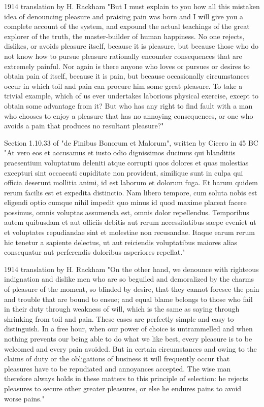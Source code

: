 \documentclass[a4paper,12pt]{article}
\begin{document}
1914 translation by H. Rackham "But I must explain to you how all this
mistaken idea of denouncing pleasure and praising pain was born and I
will give you a complete account of the system, and expound the actual
teachings of the great explorer of the truth, the master-builder of
human happiness. No one rejects, dislikes, or avoids pleasure itself,
because it is pleasure, but because those who do not know how to
pursue pleasure rationally encounter consequences that are extremely
painful. Nor again is there anyone who loves or pursues or desires to
obtain pain of itself, because it is pain, but because occasionally
circumstances occur in which toil and pain can procure him some great
pleasure. To take a trivial example, which of us ever undertakes
laborious physical exercise, except to obtain some advantage from it?
But who has any right to find fault with a man who chooses to enjoy a
pleasure that has no annoying consequences, or one who avoids a pain
that produces no resultant pleasure?"

Section 1.10.33 of "de Finibus Bonorum et Malorum", written by Cicero
in 45 BC "At vero eos et accusamus et iusto odio dignissimos ducimus
qui blanditiis praesentium voluptatum deleniti atque corrupti quos
dolores et quas molestias excepturi sint occaecati cupiditate non
provident, similique sunt in culpa qui officia deserunt mollitia
animi, id est laborum et dolorum fuga. Et harum quidem rerum facilis
est et expedita distinctio. Nam libero tempore, cum soluta nobis est
eligendi optio cumque nihil impedit quo minus id quod maxime placeat
facere possimus, omnis voluptas assumenda est, omnis dolor
repellendus. Temporibus autem quibusdam et aut officiis debitis aut
rerum necessitatibus saepe eveniet ut et voluptates repudiandae sint
et molestiae non recusandae. Itaque earum rerum hic tenetur a sapiente
delectus, ut aut reiciendis voluptatibus maiores alias consequatur aut
perferendis doloribus asperiores repellat."

1914 translation by H. Rackham "On the other hand, we denounce with
righteous indignation and dislike men who are so beguiled and
demoralized by the charms of pleasure of the moment, so blinded by
desire, that they cannot foresee the pain and trouble that are bound
to ensue; and equal blame belongs to those who fail in their duty
through weakness of will, which is the same as saying through
shrinking from toil and pain. These cases are perfectly simple and
easy to distinguish. In a free hour, when our power of choice is
untrammelled and when nothing prevents our being able to do what we
like best, every pleasure is to be welcomed and every pain
avoided. But in certain circumstances and owing to the claims of duty
or the obligations of business it will frequently occur that pleasures
have to be repudiated and annoyances accepted. The wise man therefore
always holds in these matters to this principle of selection: he
rejects pleasures to secure other greater pleasures, or else he
endures pains to avoid worse pains."
\end{document}
